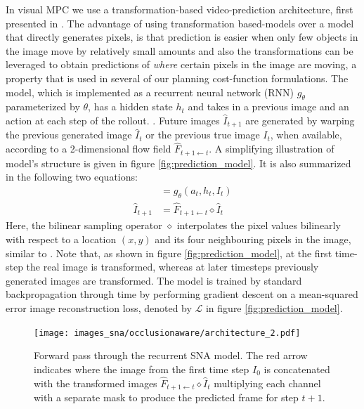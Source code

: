 In visual MPC we use a transformation-based video-prediction architecture, first presented in \cite{finn_nips}. The advantage of using transformation based-models over a model that directly generates pixels, is that prediction is easier when only few objects in the image move by relatively small amounts and also the transformations can be leveraged to obtain predictions of \emph{where} certain pixels in the image are moving, a property that is used in several of our planning cost-function formulations. The model, which is implemented as a recurrent neural network (RNN) $g_{\theta}$ parameterized by $\theta$, has a hidden state $h_t$ and takes in a previous image and an action at each step of the rollout. . Future images $\hat{I}_{t+1}$ are generated by warping the previous generated image $\hat{I}_t$ or the previous true image $I_t$, when available, according to a 2-dimensional flow field $\hat{F}_{t+1 \leftarrow t}$. A simplifying illustration of model's structure is given in figure \ref{fig:prediction_model}. It is also summarized in the following two equations:
\begin{align}
[h_{t+1}, \hat{F}_{t+1 \leftarrow t}] 	&= g_{\theta}(a_t, h_t, I_t) \\
\hat{I}_{t+1} 							&= \hat{F}_{t+1 \leftarrow t} \diamond  \hat{I}_t 
\label{simple_dna}
\end{align}
Here, the bilinear sampling operator $\diamond$ interpolates the pixel values bilinearly with respect to a location $(x,y)$ and its four neighbouring pixels in the image, similar to \cite{zhou2016view}. Note that, as shown in figure \ref{fig:prediction_model}, at the first time-step the real image is transformed, whereas at later timesteps previously generated images are transformed. The model is trained by standard backpropagation through time
by performing gradient descent on a mean-squared error image reconstruction loss, denoted by $\mathcal{L}$ in figure \ref{fig:prediction_model}.
\begin{figure}[t]
    \centering
    \texttt{[image: images\_sna/occlusionaware/architecture\_2.pdf]}
    \caption{\small{Forward pass through the recurrent SNA model. The red arrow indicates where the image from the first time step $I_0$ is concatenated with the transformed images $\hat{F}_{t+1 \leftarrow t} \diamond  \hat{I}_t $ multiplying each channel with a separate mask to produce the predicted frame for step $t+1$.}}      \label{fig:occlusion_model}
\end{figure}

